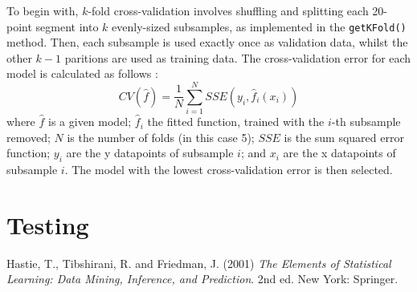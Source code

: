 \documentclass[onecolumn, 12pt, a4paper]{article}
\begin{document}
To begin with, $k$-fold cross-validation involves shuffling and 
splitting each 20-point segment into $k$ evenly-sized subsamples,
as implemented in the \texttt{getKFold()} method.
Then, each subsample is used exactly once as validation data,
whilst the other $k - 1$ paritions are used as training data.
The cross-validation error for each model is calculated
as follows \cite{EOSL}:
\[
    CV({\hat{f}}) = \frac{1}{N}\sum_{i = 1}^{N}SSE(y_{i}, \hat{f}_{i}(x_{i}))
\]
where
$\hat{f}$ is a given model;
$\hat{f}_{i}$ the fitted function, trained with the $i$-th subsample removed;
$N$ is the number of folds (in this case 5);
$SSE$ is the sum squared error function;
$y_{i}$ are the y datapoints of subsample $i$;
and $x_{i}$ are the x datapoints of subsample $i$.
The model with the lowest cross-validation error is then selected.

\section{Testing}

\begin{thebibliography}{9}
    Hastie, T., Tibshirani, R. and Friedman, J. (2001)
    \textit{The Elements of Statistical Learning: Data Mining, Inference, and Prediction}. 
    2nd ed. New York: Springer.
\end{thebibliography}
    
\end{document}
